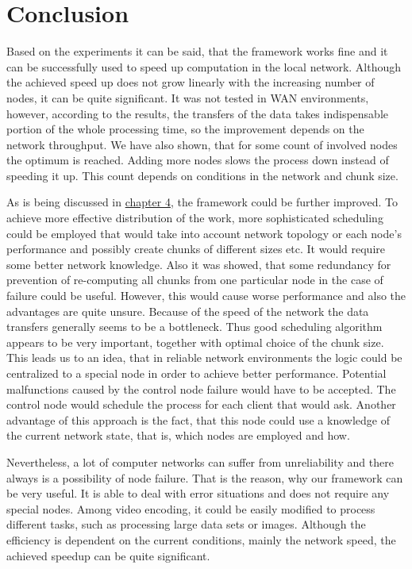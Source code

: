 \chapter*{Conclusion}
Based on the experiments it can be said, that the framework works fine and it can be successfully used to speed up computation in the local network. Although the achieved speed up does not grow linearly with the increasing number of nodes, it can be quite significant. It was not tested in WAN environments, however, according to the results, the transfers of the data takes indispensable portion of the whole processing time, so the improvement depends on the network throughput. We have also shown, that for some count of involved nodes the optimum is reached. Adding more nodes slows the process down instead of speeding it up. This count depends on conditions in the network and chunk size.

As is being discussed in \hyperref[Problems-alternatives-and-possible-improvements]{chapter 4}, the framework could be further improved. To achieve more effective distribution of the work, more sophisticated scheduling could be employed that would take into account network topology or each node's performance and possibly create chunks of different sizes etc. It would require some better network knowledge. Also it was showed, that some redundancy for prevention of re-computing all chunks from one particular node in the case of failure could be useful. However, this would cause worse performance and also the advantages are quite unsure. Because of the speed of the network the data transfers generally seems to be a bottleneck. Thus good scheduling algorithm appears to be very important, together with optimal choice of the chunk size. This leads us to an idea, that in reliable network environments the logic could be centralized to a special node in order to achieve better performance. Potential malfunctions caused by the control node failure would have to be accepted. The control node would schedule the process for each client that would ask. Another advantage of this approach is the fact, that this node could use a knowledge of the current network state, that is, which nodes are employed and how.

Nevertheless, a lot of computer networks can suffer from unreliability and there always is a possibility of node failure. That is the reason, why our framework can be very useful. It is able to deal with error situations and does not require any special nodes. Among video encoding, it could be easily modified to process different tasks, such as processing large data sets or images. Although the efficiency is dependent on the current conditions, mainly the network speed, the achieved speedup can be quite significant.